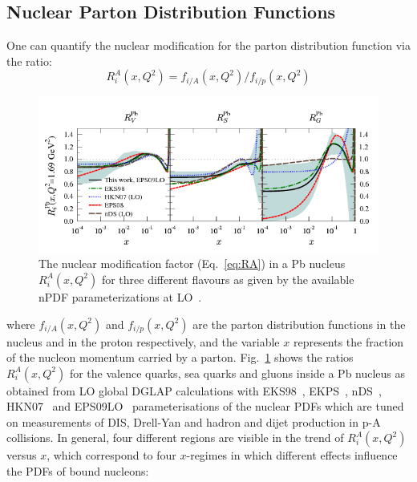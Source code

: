 \subsection{Nuclear Parton Distribution Functions}
\label{sec:nPDFs}
One can quantify the nuclear modification for the parton distribution function via the ratio:
\begin{equation}
\label{eq:RA}
R_i^A(x,Q^2) = f_{i/A}(x,Q^2) / f_{i/p}(x,Q^2)
\end{equation}
\begin{figure}[!ht]
  \centering
  \includegraphics[width=15cm]{FigCap1/PartonNMF.png}
  \caption{The nuclear modification factor (Eq.~\ref{eq:RA}) in a Pb nucleus $R_i^A(x,Q^2)$ for three different flavours as given by the available nPDF parameterizations at LO~\cite{Eskola:2009uj}.}
  \label{fig:nPDF}
\end{figure}
where $f_{i/A}(x,Q^2)$ and $f_{i/p}(x,Q^2)$ are the parton distribution functions in the 
nucleus and in the proton respectively, and the variable $x$ represents the fraction of 
the nucleon momentum carried by a parton. Fig.~\ref{fig:nPDF} 
shows the ratios $R_i^A(x,Q^2)$ for the valence quarks, sea quarks and 
gluons inside a Pb nucleus as obtained from LO global DGLAP 
calculations with EKS98~\cite{Eskola:1998df,Eskola:1998iy}, 
EKPS~\cite{Eskola:2007my},
nDS~\cite{Eskola:2008ca}, HKN07~\cite{Hirai:2007sx} and EPS09LO~\cite{Eskola:2009uj}
parameterisations of the nuclear PDFs which are tuned on measurements
of DIS, Drell-Yan and hadron and dijet production in p-A collisions. 
In general, four different regions are visible in the trend of $R_i^A(x,Q^2)$ versus $x$,
which correspond to four $x$-regimes in which different 
effects influence the PDFs of bound nucleons:
